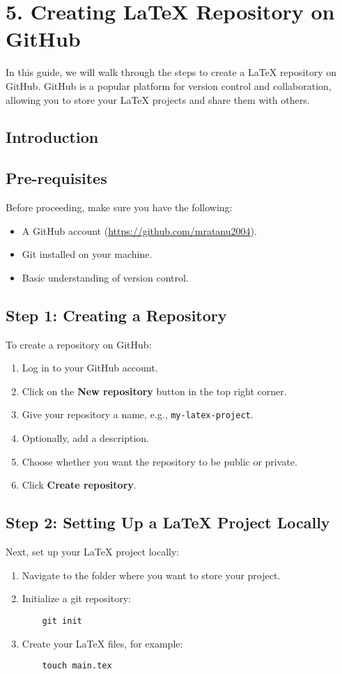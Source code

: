 \documentclass{article}
\begin{document}
\section*{5. Creating LaTeX Repository on GitHub}

In this guide, we will walk through the steps to create a LaTeX repository on GitHub. GitHub is a popular platform for version control and collaboration, allowing you to store your LaTeX projects and share them with others.

\subsection*{Introduction}

\subsection*{Pre-requisites}
Before proceeding, make sure you have the following:
\begin{itemize}
    \item A GitHub account (\url{https://github.com/mratanu2004}).
    \item Git installed on your machine.
    \item Basic understanding of version control.
\end{itemize}

\subsection*{Step 1: Creating a Repository}
To create a repository on GitHub:
\begin{enumerate}
    \item Log in to your GitHub account.
    \item Click on the \textbf{New repository} button in the top right corner.
    \item Give your repository a name, e.g., \texttt{my-latex-project}.
    \item Optionally, add a description.
    \item Choose whether you want the repository to be public or private.
    \item Click \textbf{Create repository}.
\end{enumerate}

\subsection*{Step 2: Setting Up a LaTeX Project Locally}
Next, set up your LaTeX project locally:
\begin{enumerate}
    \item Navigate to the folder where you want to store your project.
    \item Initialize a git repository:
    \begin{verbatim}
    git init
    \end{verbatim}
    \item Create your LaTeX files, for example:
    \begin{verbatim}
    touch main.tex
    \end{verbatim}
\end{enumerate}
\end{document}
